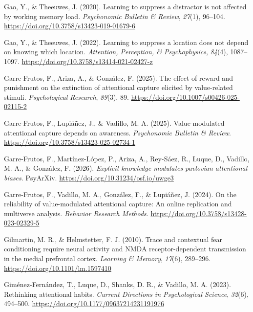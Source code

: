 \documentclass[
  man,
  floatsintext,
  longtable,
  nolmodern,
  notxfonts,
  notimes,
  mask,
  colorlinks=true,linkcolor=blue,citecolor=blue,urlcolor=blue]{apa7}
\newlength{\cslhangindent}
\newenvironment{CSLReferences}[2] %
 {\begin{list}{}{%
  \setlength{\itemindent}{0pt}
  \setlength{\leftmargin}{0pt}
  \setlength{\parsep}{0pt}
  \ifodd #1
   \setlength{\leftmargin}{\cslhangindent}
   \setlength{\itemindent}{-1\cslhangindent}
  \fi
  \setlength{\itemsep}{#2\baselineskip}}}
 {\end{list}}
\begin{document}
\begin{CSLReferences}{1}{0}
Gao, Y., \& Theeuwes, J. (2020). Learning to suppress a distractor is
not affected by working memory load. \emph{Psychonomic Bulletin \&
Review}, \emph{27}(1), 96--104.
\url{https://doi.org/10.3758/s13423-019-01679-6}

Gao, Y., \& Theeuwes, J. (2022). Learning to suppress a location does
not depend on knowing which location. \emph{Attention, Perception, \&
Psychophysics}, \emph{84}(4), 1087--1097.
\url{https://doi.org/10.3758/s13414-021-02427-z}

Garre-Frutos, F., Ariza, A., \& González, F. (2025). The effect of
reward and punishment on the extinction of attentional capture elicited
by value-related stimuli. \emph{Psychological Research}, \emph{89}(3),
89. \url{https://doi.org/10.1007/s00426-025-02115-2}

Garre-Frutos, F., Lupiáñez, J., \& Vadillo, M. A. (2025).
Value-modulated attentional capture depends on awareness.
\emph{Psychonomic Bulletin \& Review}.
\url{https://doi.org/10.3758/s13423-025-02734-1}

Garre-Frutos, F., Martínez-López, P., Ariza, A., Rey-Sáez, R., Luque,
D., Vadillo, M. A., \& González, F. (2026). \emph{Explicit knowledge
modulates pavlovian attentional biases}. PsyArXiv.
\url{https://doi.org/10.31234/osf.io/uwge3}

Garre-Frutos, F., Vadillo, M. A., González, F., \& Lupiáñez, J. (2024).
On the reliability of value-modulated attentional capture: An online
replication and multiverse analysis. \emph{Behavior Research Methods}.
\url{https://doi.org/10.3758/s13428-023-02329-5}

Gilmartin, M. R., \& Helmstetter, F. J. (2010). Trace and contextual
fear conditioning require neural activity and NMDA receptor-dependent
transmission in the medial prefrontal cortex. \emph{Learning \& Memory},
\emph{17}(6), 289--296. \url{https://doi.org/10.1101/lm.1597410}

Giménez-Fernández, T., Luque, D., Shanks, D. R., \& Vadillo, M. A.
(2023). Rethinking attentional habits. \emph{Current Directions in
Psychological Science}, \emph{32}(6), 494--500.
\url{https://doi.org/10.1177/09637214231191976}


\end{CSLReferences}
\end{document}
